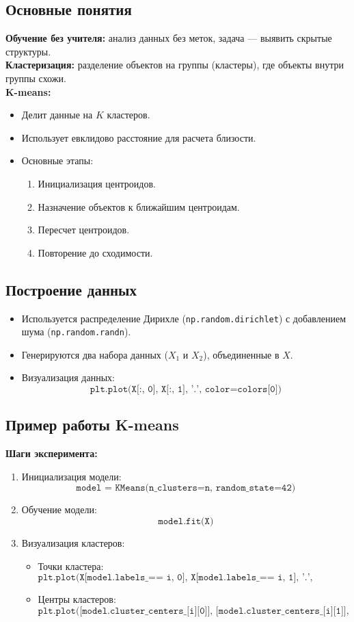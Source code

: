\subsection*{Основные понятия}
\textbf{Обучение без учителя:} анализ данных без меток, задача — выявить скрытые структуры.\\
\textbf{Кластеризация:} разделение объектов на группы (кластеры), где объекты внутри группы схожи.\\
\textbf{K-means:}
\begin{itemize}
    \item Делит данные на $K$ кластеров.
    \item Использует евклидово расстояние для расчета близости.
    \item Основные этапы:
    \begin{enumerate}
        \item Инициализация центроидов.
        \item Назначение объектов к ближайшим центроидам.
        \item Пересчет центроидов.
        \item Повторение до сходимости.
    \end{enumerate}
\end{itemize}

\subsection*{Построение данных}
\begin{itemize}
    \item Используется распределение Дирихле (\texttt{np.random.dirichlet}) с добавлением шума (\texttt{np.random.randn}).
    \item Генерируются два набора данных ($X_1$ и $X_2$), объединенные в $X$.
    \item Визуализация данных:
    \[
    \texttt{plt.plot(X[:, 0], X[:, 1], '.', color=colors[0])}
    \]
\end{itemize}

\subsection*{Пример работы K-means}
\textbf{Шаги эксперимента:}
\begin{enumerate}
    \item Инициализация модели:
    \[
    \texttt{model = KMeans(n\_clusters=n, random\_state=42)}
    \]
    \item Обучение модели:
    \[
    \texttt{model.fit(X)}
    \]
    \item Визуализация кластеров:
    \begin{itemize}
        \item Точки кластера:
        \[
        \texttt{plt.plot(X[model.labels\_ == i, 0], X[model.labels\_ == i, 1], '.', color=colors[i])}
        \]
        \item Центры кластеров:
        \[
        \texttt{plt.plot([model.cluster\_centers\_[i][0]], [model.cluster\_centers\_[i][1]], 'x', c=colors[i], markersize=20)}
        \]
    \end{itemize}
\end{enumerate}

